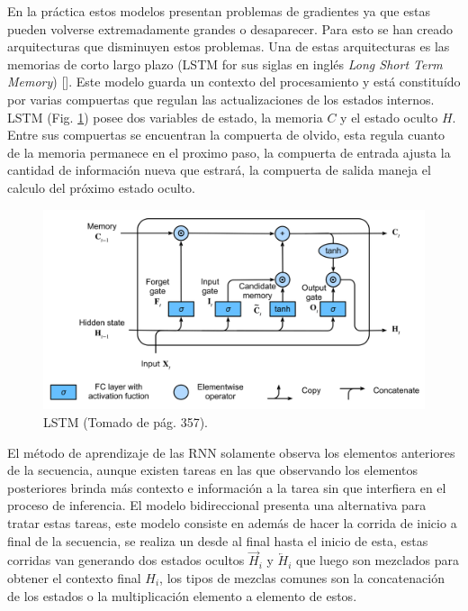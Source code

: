 En la práctica estos modelos presentan problemas de gradientes ya que estas pueden volverse extremadamente grandes o 
desaparecer.
Para esto se han creado arquitecturas que disminuyen estos problemas. Una de estas arquitecturas es las memorias
de corto largo plazo (LSTM for sus siglas en inglés \emph{Long Short Term Memory}) [\cite{hochreiter1997long}].
Este modelo guarda un contexto del procesamiento y está constituído por varias compuertas que regulan las 
actualizaciones de los estados internos. LSTM (Fig. \ref{fig:rnn_lstm}) posee dos variables de estado, la memoria 
$C$ y el estado oculto $H$. Entre sus compuertas se encuentran la compuerta de olvido, esta regula cuanto de la 
memoria permanece en el proximo paso, la compuerta de entrada ajusta la cantidad de información nueva que estrará, 
la compuerta de salida maneja el calculo del próximo estado oculto.

\begin{figure}[h!]
	\begin{center}
		\begin{center}
			\includegraphics[scale=.3]{Graphics/rnn_lstm.png}
        \end{center}
	    \caption{LSTM (Tomado de \cite{d2l} pág. 357).}\label{fig:rnn_lstm}
	\end{center}
\end{figure}

El método de aprendizaje de las RNN solamente observa los elementos anteriores de la secuencia, aunque existen
tareas en las que observando los elementos posteriores brinda más contexto e información a la tarea sin que interfiera
en el proceso de inferencia. El modelo bidireccional presenta una alternativa para tratar estas tareas, este modelo
consiste en además de hacer la corrida de inicio a final de la secuencia, se realiza un desde al final hasta el  
inicio de esta, estas corridas van generando dos estados ocultos $\overrightarrow{H}_{i}$ y $\overleftarrow{H}_{i}$
que luego son mezclados para obtener el contexto final $H_i$, los tipos de mezclas comunes son la concatenación de los 
estados o la multiplicación elemento a elemento de estos.

